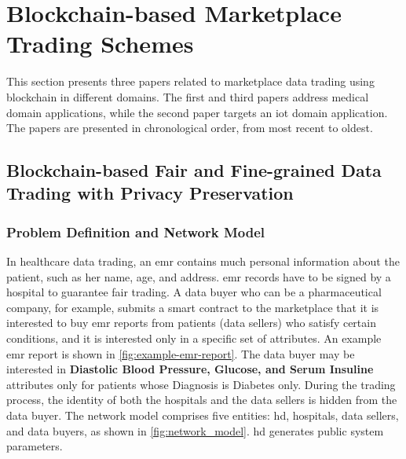 \section{Blockchain-based Marketplace Trading Schemes }
\label{sec:blockchain-marketplace-trading-schemes}

This section presents three papers related to marketplace data trading using blockchain in different domains.
The first and third papers address medical domain applications, while the second paper targets an \ac{iot} domain application.
The papers are presented in chronological order, from most recent to oldest.

\subsection{Blockchain-based Fair and Fine-grained Data Trading with Privacy Preservation~\cite{xue2023blockchain}}
\label{sec:blockchain-based-medical-data-marketplace-23}

\subsubsection{Problem Definition and Network Model}
\label{sec:2023-problem-definition}
In healthcare data trading, an \ac{emr} contains much personal information about the patient, such as her name, age, and address.
\ac{emr} records have to be signed by a hospital to guarantee fair trading.
A data buyer who can be a pharmaceutical company, for example, submits a smart contract to the marketplace that it is interested to buy \ac{emr} reports from patients (data sellers) who satisfy certain conditions, and it is interested only in a specific set of attributes.
An example \ac{emr} report is shown in \cref{fig:example-emr-report}.
The data buyer may be interested in \textbf{Diastolic Blood Pressure, Glucose, and Serum Insuline} attributes only for patients whose Diagnosis is Diabetes only.
During the trading process, the identity of both the hospitals and the data sellers is hidden from the data buyer.
The network model comprises five entities: \ac{hd}, hospitals, data sellers, and data buyers, as shown in \cref{fig:network_model}.
\ac{hd} generates public system parameters.

